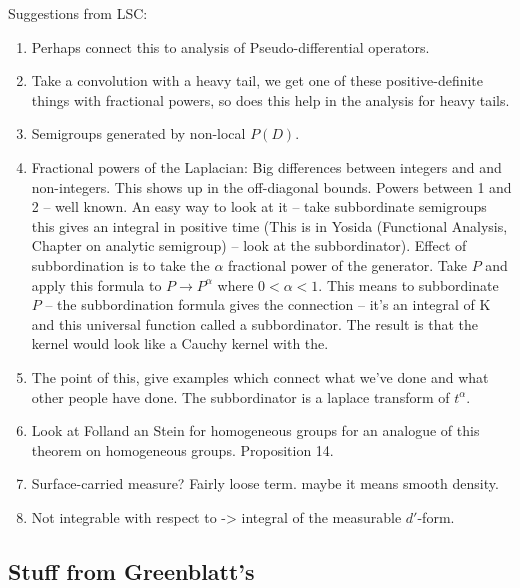 \documentclass[11pt]{article}
\begin{document}
Suggestions from LSC:
\begin{enumerate}
\item Perhaps connect this to analysis of Pseudo-differential operators. 
\item Take a convolution with a heavy tail, we get one of these positive-definite things with fractional powers, so does this help in the analysis for heavy tails.
\item Semigroups generated by non-local $P(D)$. 
\item Fractional powers of the Laplacian: Big differences between integers and and non-integers. This shows up in the off-diagonal bounds. Powers between 1 and 2 -- well known. An easy way to look at it -- take subbordinate semigroups this gives an integral in positive time (This is in Yosida (Functional Analysis, Chapter on analytic semigroup) -- look at the subbordinator). Effect of subbordination is to take the $\alpha$ fractional power of the generator. Take $P$ and apply this formula to $P\to P^{\alpha}$ where $0<\alpha<1$. This means to subbordinate $P$ -- the subbordination formula gives the connection -- it's an integral of K and this universal function called a subbordinator. The result is that the kernel would look like a Cauchy kernel with the. 
\item The point of this, give examples which connect what we've done and what other people have done. The subbordinator is a laplace transform of $t^{\alpha}$.
\item Look at Folland an Stein for homogeneous groups for an analogue of this theorem on homogeneous groups. Proposition 14.
\item Surface-carried measure? Fairly loose term. maybe it means smooth density. \item Not integrable with respect to -> integral of the measurable $d'$-form.
\end{enumerate}

\subsection{Stuff from Greenblatt's}
\end{document}
